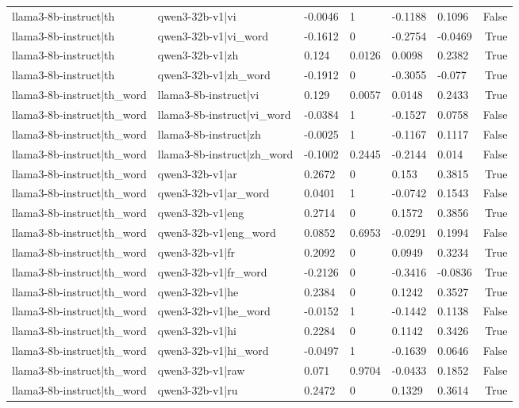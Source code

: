 \begin{table}
\begin{tabular}{llllllr}
llama3-8b-instruct|th & qwen3-32b-v1|vi & -0.0046 & 1 & -0.1188 & 0.1096 & False \\
llama3-8b-instruct|th & qwen3-32b-v1|vi_word & -0.1612 & 0 & -0.2754 & -0.0469 & True \\
llama3-8b-instruct|th & qwen3-32b-v1|zh & 0.124 & 0.0126 & 0.0098 & 0.2382 & True \\
llama3-8b-instruct|th & qwen3-32b-v1|zh_word & -0.1912 & 0 & -0.3055 & -0.077 & True \\
llama3-8b-instruct|th_word & llama3-8b-instruct|vi & 0.129 & 0.0057 & 0.0148 & 0.2433 & True \\
llama3-8b-instruct|th_word & llama3-8b-instruct|vi_word & -0.0384 & 1 & -0.1527 & 0.0758 & False \\
llama3-8b-instruct|th_word & llama3-8b-instruct|zh & -0.0025 & 1 & -0.1167 & 0.1117 & False \\
llama3-8b-instruct|th_word & llama3-8b-instruct|zh_word & -0.1002 & 0.2445 & -0.2144 & 0.014 & False \\
llama3-8b-instruct|th_word & qwen3-32b-v1|ar & 0.2672 & 0 & 0.153 & 0.3815 & True \\
llama3-8b-instruct|th_word & qwen3-32b-v1|ar_word & 0.0401 & 1 & -0.0742 & 0.1543 & False \\
llama3-8b-instruct|th_word & qwen3-32b-v1|eng & 0.2714 & 0 & 0.1572 & 0.3856 & True \\
llama3-8b-instruct|th_word & qwen3-32b-v1|eng_word & 0.0852 & 0.6953 & -0.0291 & 0.1994 & False \\
llama3-8b-instruct|th_word & qwen3-32b-v1|fr & 0.2092 & 0 & 0.0949 & 0.3234 & True \\
llama3-8b-instruct|th_word & qwen3-32b-v1|fr_word & -0.2126 & 0 & -0.3416 & -0.0836 & True \\
llama3-8b-instruct|th_word & qwen3-32b-v1|he & 0.2384 & 0 & 0.1242 & 0.3527 & True \\
llama3-8b-instruct|th_word & qwen3-32b-v1|he_word & -0.0152 & 1 & -0.1442 & 0.1138 & False \\
llama3-8b-instruct|th_word & qwen3-32b-v1|hi & 0.2284 & 0 & 0.1142 & 0.3426 & True \\
llama3-8b-instruct|th_word & qwen3-32b-v1|hi_word & -0.0497 & 1 & -0.1639 & 0.0646 & False \\
llama3-8b-instruct|th_word & qwen3-32b-v1|raw & 0.071 & 0.9704 & -0.0433 & 0.1852 & False \\
llama3-8b-instruct|th_word & qwen3-32b-v1|ru & 0.2472 & 0 & 0.1329 & 0.3614 & True \\

\end{tabular}
\end{table}
